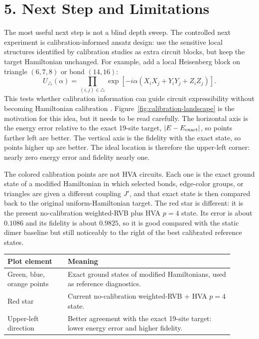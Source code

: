 \documentclass[10pt]{article}
\begin{document}
\newpage

\section*{5. Next Step and Limitations}

The most useful next step is not a blind depth sweep.  The controlled next experiment is calibration-informed ansatz design: use the sensitive local structures identified by calibration studies as extra circuit blocks, but keep the target Hamiltonian unchanged.  For example, add a local Heisenberg block on triangle $(6,7,8)$ or bond $(14,16)$:
\[
U_{\triangle}(\alpha)=\prod_{(i,j)\in \triangle}
\exp[-i\alpha(X_iX_j+Y_iY_j+Z_iZ_j)].
\]
This tests whether calibration information can guide circuit expressibility without becoming Hamiltonian calibration \cite{ahsan2026}.  Figure~\ref{fig:calibration-landscape} is the motivation for this idea, but it needs to be read carefully.  The horizontal axis is the energy error relative to the exact 19-site target, $|E-E_{\rm exact}|$, so points farther left are better.  The vertical axis is the fidelity with the exact state, so points higher up are better.  The ideal location is therefore the upper-left corner: nearly zero energy error and fidelity nearly one.

The colored calibration points are not HVA circuits.  Each one is the exact ground state of a modified Hamiltonian in which selected bonds, edge-color groups, or triangles are given a different coupling $J'$, and that exact state is then compared back to the original uniform-Hamiltonian target.  The red star is different: it is the present no-calibration weighted-RVB plus HVA $p=4$ state.  Its error is about $0.1086$ and its fidelity is about $0.9825$, so it is good compared with the static dimer baseline but still noticeably to the right of the best calibrated reference states.

\begin{center}
\begin{tabular}{p{0.24\linewidth}p{0.66\linewidth}}
\toprule
Plot element & Meaning \\
\midrule
Green, blue, orange points & Exact ground states of modified Hamiltonians, used as reference diagnostics. \\
Red star & Current no-calibration weighted-RVB + HVA $p=4$ state. \\
Upper-left direction & Better agreement with the exact 19-site target: lower energy error and higher fidelity. \\
\bottomrule
\end{tabular}
\end{center}
\end{document}
